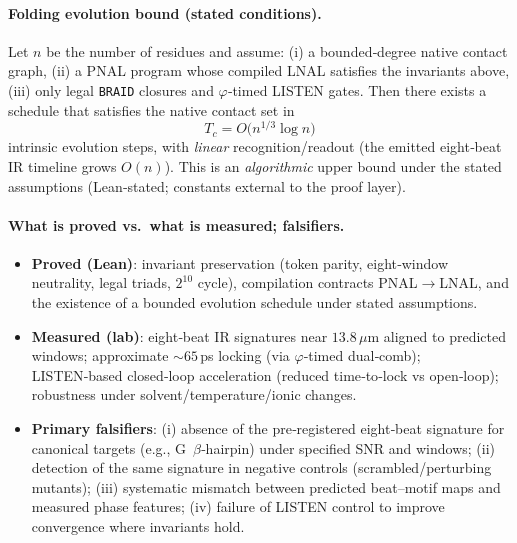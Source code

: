 \documentclass[12pt,a4paper]{article}
\begin{document}
\paragraph{Folding evolution bound (stated conditions).}
Let $n$ be the number of residues and assume:
(i) a bounded‑degree native contact graph,
(ii) a PNAL program whose compiled LNAL satisfies the invariants above,
(iii) only legal \texttt{BRAID} closures and $\varphi$‑timed LISTEN gates.
Then there exists a schedule that satisfies the native contact set in
\[
T_c = O\!\bigl(n^{1/3}\log n\bigr)
\]
intrinsic evolution steps, with \emph{linear} recognition/readout (the emitted eight‑beat IR timeline grows $O(n)$). This is an \emph{algorithmic} upper bound under the stated assumptions (Lean‑stated; constants external to the proof layer).

\paragraph{What is proved vs.\ what is measured; falsifiers.}
\begin{itemize}
  \item \textbf{Proved (Lean)}: invariant preservation (token parity, eight‑window neutrality, legal triads, $2^{10}$ cycle), compilation contracts PNAL$\to$LNAL, and the existence of a bounded evolution schedule under stated assumptions.
  \item \textbf{Measured (lab)}: eight‑beat IR signatures near $13.8\,\mu$m aligned to predicted windows; approximate $\sim 65$\,ps locking (via $\varphi$‑timed dual‑comb); LISTEN‑based closed‑loop acceleration (reduced time‑to‑lock vs open‑loop); robustness under solvent/temperature/ionic changes.
  \item \textbf{Primary falsifiers}: (i) absence of the pre‑registered eight‑beat signature for canonical targets (e.g., G~$\beta$‑hairpin) under specified SNR and windows; (ii) detection of the same signature in negative controls (scrambled/perturbing mutants); (iii) systematic mismatch between predicted beat–motif maps and measured phase features; (iv) failure of LISTEN control to improve convergence where invariants hold.
\end{itemize}
\end{document}
